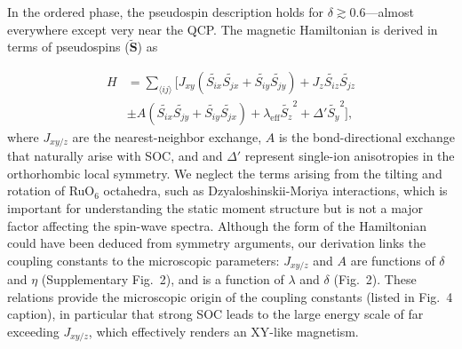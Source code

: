 In the ordered phase, the pseudospin description holds for $\delta\gtrsim0.6$---almost everywhere except very near the QCP. The magnetic Hamiltonian is derived in terms of pseudospins ($\tilde{\mathbf{S}}$) as

\begin{align*}
H &= \sum_{\langle ij\rangle } 
[J_{xy} (\tilde{S_{ix}} \tilde{S_{jx}}+\tilde{S_{iy}} \tilde{S_{jy}}) + J_z \tilde{S_{iz}} \tilde{S_{jz}} \\
&\pm A (\tilde{S_{ix}} \tilde{S_{jy}}+\tilde{S_{iy}} \tilde{S_{jx}}) + \lambda_{\mathrm{eff}} \tilde{S_z}^2 +\Delta' \tilde{S_y}^2],
\end{align*}
\noindent
where $J_{xy/z}$ are the nearest-neighbor exchange, $A$ is the bond-directional exchange that naturally arise with SOC, and \leff and $\Delta'$ represent single-ion anisotropies in the orthorhombic local symmetry. We neglect the terms arising from the tilting and rotation of RuO$_6$ octahedra, such as Dzyaloshinskii-Moriya interactions, which is important for understanding the static moment structure but is not a major factor affecting the spin-wave spectra.  Although the form of the Hamiltonian could have been deduced from symmetry arguments, our derivation %
links the coupling constants to the microscopic parameters: $J_{xy/z}$ and $A$ are functions of $\delta$ and $\eta$ (Supplementary Fig.~2), and \leff is a function of $\lambda$ and $\delta$ (Fig.~2). These relations provide the microscopic origin of the coupling constants (listed in Fig.~4 caption), in particular that strong SOC leads to the large energy scale of \leff far exceeding $J_{xy/z}$, which effectively renders an XY-like magnetism.
  
